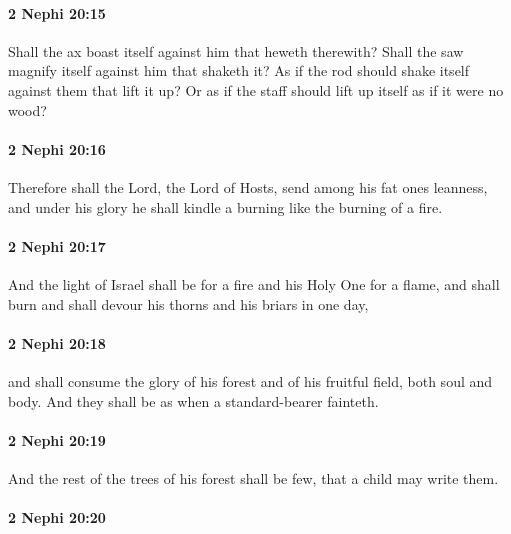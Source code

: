 		\paragraph{2 Nephi 20:15} %
			\label{2NEPHI-20-15}

			Shall the ax boast itself against him that heweth therewith?
			Shall the saw magnify itself against him that shaketh it?
			As if the rod should shake itself against them that lift it up?
			Or as if the staff should lift up itself as if it were no wood?

		\paragraph{2 Nephi 20:16} %
			\label{2NEPHI-20-16}

			Therefore shall the Lord, the Lord of Hosts, send among his fat ones leanness,
			and under his glory he shall kindle a burning like the burning of a fire.

		\paragraph{2 Nephi 20:17} %
			\label{2NEPHI-20-17}

			And the light of Israel shall be for a fire and his Holy One for a flame,
			and shall burn and shall devour his thorns and his briars in one day,

		\paragraph{2 Nephi 20:18} %
			\label{2NEPHI-20-18}

			and shall consume the glory of his forest and of his fruitful field,
			both soul and body.
			And they shall be as when a standard-bearer fainteth.

		\paragraph{2 Nephi 20:19} %
			\label{2NEPHI-20-19}

			And the rest of the trees of his forest shall be few,
			that a child may write them.

		\paragraph{2 Nephi 20:20} %
			\label{2NEPHI-20-20}

